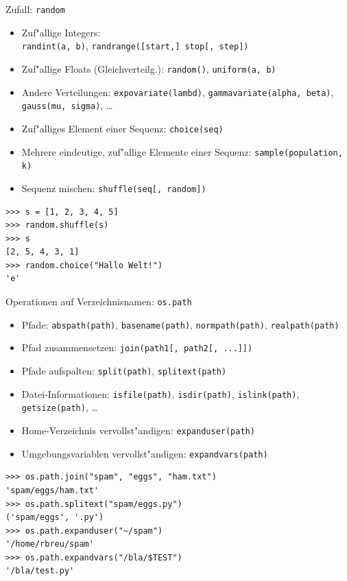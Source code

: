 \begin{frame}[fragile]{Zufall: \texttt{random}}
\begin{itemize}
\item Zuf"allige Integers: \\ \texttt{randint(a, b)},  \texttt{randrange([start,] stop[, step])}
\item Zuf"allige Floats (Gleichverteilg.): \texttt{random()}, \texttt{uniform(a, b)}
\item Andere Verteilungen: \texttt{expovariate(lambd)}, \texttt{gammavariate(alpha, beta)}, \texttt{gauss(mu, sigma)}, \dots
\item Zuf"alliges Element einer Sequenz: \texttt{choice(seq)}
\item Mehrere eindeutige, zuf"allige Elemente einer Sequenz: \texttt{sample(population, k)}
\item Sequenz mischen: \texttt{shuffle(seq[, random])}
\end{itemize}
\begin{lstlisting}[style=Python]
>>> s = [1, 2, 3, 4, 5]
>>> random.shuffle(s)
>>> s
[2, 5, 4, 3, 1]
>>> random.choice("Hallo Welt!")
'e'
\end{lstlisting}
\end{frame}

\begin{frame}[fragile]{Operationen auf Verzeichnisnamen: \texttt{os.path}}
\begin{itemize}
\item Pfade: \texttt{abspath(path)}, \texttt{basename(path)}, \texttt{normpath(path)}, \texttt{realpath(path)}
\item Pfad zusammensetzen: \texttt{join(path1[, path2[, ...]])}
\item Pfade aufspalten: \texttt{split(path)}, \texttt{splitext(path)}
\item Datei-Informationen: \texttt{isfile(path)}, \texttt{isdir(path)}, \texttt{islink(path)}, \texttt{getsize(path)}, \dots
\item Home-Verzeichnis vervollst"andigen: \texttt{expanduser(path)}
\item Umgebungsvariablen vervollst"andigen: \texttt{expandvars(path)}
\end{itemize} 
\begin{lstlisting}[style=Shell]
>>> os.path.join("spam", "eggs", "ham.txt")
'spam/eggs/ham.txt'
>>> os.path.splitext("spam/eggs.py")
('spam/eggs', '.py')
>>> os.path.expanduser("~/spam")
'/home/rbreu/spam'
>>> os.path.expandvars("/bla/$TEST")
'/bla/test.py'
\end{lstlisting}%
\end{frame}

